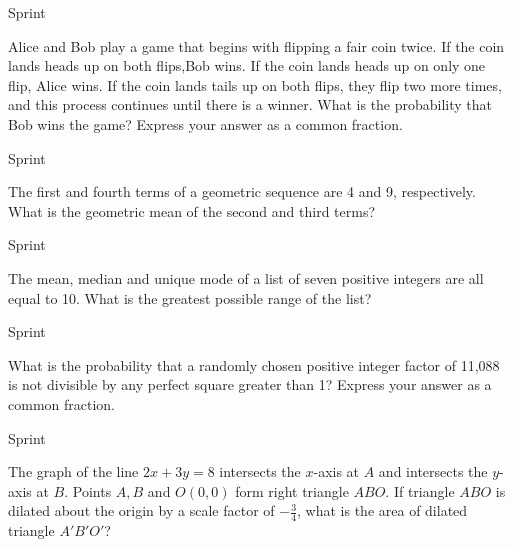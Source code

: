 \documentclass[9pt]{beamer}
\begin{document}
\begin{frame}[t]{Sprint \insertframenumber}
\begin{block}{}
    Alice and Bob play a game that begins with flipping a fair coin twice. If the coin lands heads up on both flips,Bob wins. If the coin lands heads up on only one flip, Alice wins. If the coin lands tails up on both flips, they flip two more times, and this process continues until there is a winner. What is the probability that Bob wins the game? Express your answer as a common fraction.
    
\end{block}
\end{frame}

\begin{frame}[t]{Sprint \insertframenumber}
\begin{block}{}
    The first and fourth terms of a geometric sequence are 4 and 9, respectively. What is the geometric mean of the second and third terms?
    
\end{block}
\end{frame}

\begin{frame}[t]{Sprint \insertframenumber}
\begin{block}{}
    The mean, median and unique mode of a list of seven positive integers are all equal to 10. What is the greatest possible range of the list?
    
\end{block}
\end{frame}

\begin{frame}[t]{Sprint \insertframenumber}
\begin{block}{}
    What is the probability that a randomly chosen positive integer factor of 11,088 is not divisible by any perfect square greater than 1? Express your answer as a common fraction.
    
\end{block}
\end{frame}

\begin{frame}[t]{Sprint \insertframenumber}
\begin{block}{}
    The graph of the line $ 2x+3y=8 $ intersects the $ x $-axis at $ A $ and intersects the $ y $-axis at $ B $. Points $ A,B $ and $ O(0,0) $ form right triangle $ ABO $. If triangle $ ABO $ is dilated about the origin by a scale factor of $ -\frac{3}{4} $, what is the area of dilated triangle $ A'B'O' $?
    
\end{block}
\end{frame}
\end{document}
